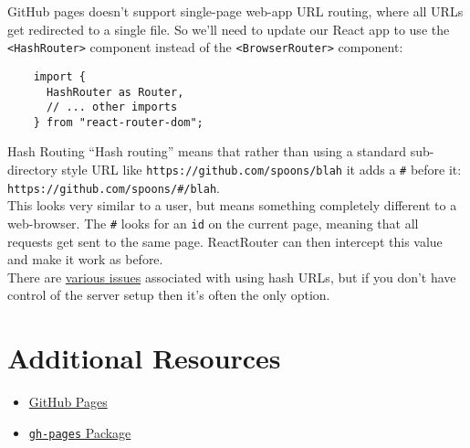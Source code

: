 GitHub pages doesn't support single-page web-app URL routing, where all URLs get redirected to a single file. So we'll need to update our React app to use the \texttt{<HashRouter>} component instead of the \texttt{<BrowserRouter>} component:

\begin{verbatim}
    import {
      HashRouter as Router,
      // ... other imports
    } from "react-router-dom";
\end{verbatim}

\pagebreak


\begin{infobox}{Hash Routing}
    ``Hash routing'' means that rather than using a standard sub-directory style URL like \texttt{https://github.com/spoons/blah} it adds a \texttt{\#} before it: \\ \texttt{https://github.com/spoons/\#/blah}.
    \\

    This looks very similar to a user, but means something completely different to a web-browser. The \texttt{\#} looks for an \texttt{id} on the current page, meaning that all requests get sent to the same page. ReactRouter can then intercept this value and make it work as before.
    \\

    There are \href{https://www.quora.com/Are-hashbang-URLs-a-recommended-practice}{various issues} associated with using hash URLs, but if you don't have control of the server setup then it's often the only option.
\end{infobox}


\section{Additional Resources}

\begin{itemize}[leftmargin=*]
    \item \href{https://pages.github.com}{GitHub Pages}
    \item \href{https://github.com/tschaub/gh-pages}{\texttt{gh-pages} Package}
\end{itemize}
